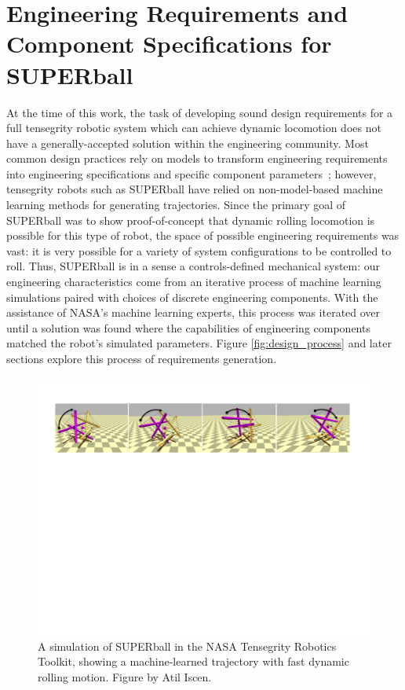 \documentclass[12pt]{report}
\begin{document}

\chapter{Engineering Requirements and Component Specifications for SUPERball}

At the time of this work, the task of developing sound design requirements for a full tensegrity robotic system which can achieve dynamic locomotion does not have a generally-accepted solution within the engineering community.
Most common design practices rely on models to transform engineering requirements into engineering specifications and specific component parameters~\cite{dieter2008engineering}; however, tensegrity robots such as SUPERball have relied on non-model-based machine learning methods for generating trajectories.
Since the primary goal of SUPERball was to show proof-of-concept that dynamic rolling locomotion is possible for this type of robot, the space of possible engineering requirements was vast: it is very possible for a variety of system configurations to be controlled to roll.
Thus, SUPERball is in a sense a controls-defined mechanical system: our engineering characteristics come from an iterative process of machine learning simulations paired with choices of discrete engineering components.
With the assistance of NASA's machine learning experts, this process was iterated over until a solution was found where the capabilities of engineering components matched the robot's simulated parameters.
Figure \ref{fig:design_process} and later sections explore this process of requirements generation.

\begin{figure}[thpb]
      \centering
      \includegraphics[width=0.9\columnwidth]{img/fig_rolling.pdf}
      \caption{A simulation of SUPERball in the NASA Tensegrity Robotics Toolkit, showing a machine-learned trajectory with fast dynamic rolling motion. Figure by Atil Iscen.~\cite{NIACfinalreport}}
      \label{fig:superball_rolling_ntrt}
      \vspace{-0.2cm}
\end{figure}
\end{document}
